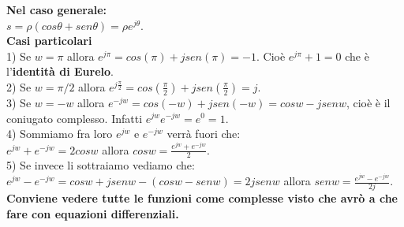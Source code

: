 \textbf{Nel caso generale:}\\
$ s = \rho ( cos \theta + sen \theta ) = \rho e^{j \theta} $.\\

\textbf{Casi particolari}\\
1) Se $ w = \pi $ allora $ e^{j \pi} = cos( \pi) + j sen(\pi) = -1$. Cioè $ e^{j \pi} +1=0 $ che è l'\textbf{identità di Eurelo}.\\
2) Se $ w = \pi/2 $ allora $ e^{j\frac{\pi}{2}} = cos( \frac{\pi}{2}) + j sen(\frac{\pi}{2}) = j$.\\
3) Se $ w = -w $ allora $ e^{-jw} = cos( -w) + j sen(-w) = cosw-jsenw $, cioè è il coniugato complesso. Infatti $ e^{jw} e^{-jw} = e^{0} = 1 $.\\
4) Sommiamo fra loro $e^{jw}$ e $e^{-jw}$ verrà fuori che:\\
$ e^{jw} + e^{-jw} = 2 cosw $ allora $ cosw = \frac{e^{jw} + e^{-jw}}{2} $.\\
5) Se invece li sottraiamo vediamo che:\\
$ e^{jw} - e^{-jw} = cosw+jsenw-(cosw-senw)=2jsenw $ allora $ senw = \frac{e^{jw} - e^{-jw}}{2j} $.\\


\textbf{Conviene vedere tutte le funzioni come complesse visto che avrò a che fare con equazioni differenziali.}



















